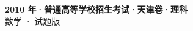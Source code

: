 \documentclass[zihao=-4, a4paper]{ctexart}
\begin{document}
\begin{center}
  {\Large\bfseries 2010 年·普通高等学校招生考试·天津卷·理科}\\[4pt]
  {\large 数学 · 试题版}
\end{center}
\medskip
{}

\end{document}

